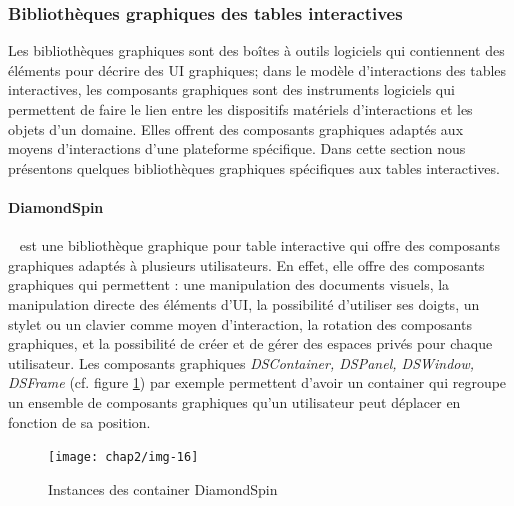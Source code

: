 \subsubsection{Bibliothèques graphiques des tables interactives}
\label{sec:chap2:3:2}
Les bibliothèques graphiques sont des boîtes à outils logiciels qui contiennent des éléments pour décrire des UI graphiques; dans le modèle d'interactions des tables interactives, les composants graphiques sont des instruments logiciels qui permettent de faire le lien entre les dispositifs matériels d'interactions et les objets d'un domaine. Elles offrent des composants graphiques adaptés aux moyens d'interactions d'une plateforme spécifique. Dans cette section nous présentons quelques bibliothèques graphiques spécifiques aux tables interactives.

\paragraph{DiamondSpin}
\label{sec:chap2:2:2:1} ~\cite{Shen2004} est une bibliothèque graphique pour table interactive qui offre des composants graphiques adaptés à plusieurs utilisateurs. En effet, elle offre des composants graphiques qui permettent : une manipulation des documents visuels, la manipulation directe des éléments d'UI, la possibilité d'utiliser ses doigts, un stylet ou un clavier comme moyen d'interaction, la rotation des composants graphiques, et la possibilité de créer et de gérer des espaces privés pour chaque utilisateur. Les composants graphiques \textit{DSContainer, DSPanel, DSWindow, DSFrame} (cf. figure \ref{fig:chap2:2}) par exemple permettent d'avoir un container qui regroupe un ensemble de composants graphiques qu'un utilisateur peut déplacer en fonction de sa position. 
\begin{figure}[ht]
\begin{center}
\texttt{[image: chap2/img-16]}
\caption{Instances des container DiamondSpin}\label{fig:chap2:2}
\end{center}
\end{figure}

